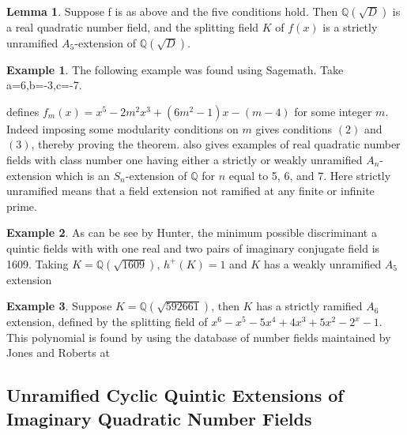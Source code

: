 \documentclass[12pt]{extarticle}
\newcommand{\Q}{\mathbb{Q}}
\newcommand{\<}{\langle}
\renewcommand{\>}{\rangle}
\theoremstyle{definition}
\newtheorem*{example}{Example}
\newtheorem{lemma}{Lemma}
\begin{document}
\begin{lemma}
Suppose f is as above and the five conditions hold. Then $\Q(\sqrt{D})$ is a real quadratic number field, and the splitting field $K$ of $f(x) $ is a strictly unramified $A_5$-extension of $\Q(\sqrt{D})$. 
\end{lemma}
\begin{example}
    The following example was found using Sagemath. Take a=6,b=-3,c=-7. 
\end{example}
\cite{YAMAMURA2} defines $f_m(x)= x^5-2m^2x^3+(6m^2-1)x-(m-4)$ for some integer $m$. Indeed imposing some modularity conditions on $m$ gives conditions $(2)$ and $(3)$, thereby proving the theorem. 
\cite{YAMAMURA2} also gives examples of real quadratic number fields with class number one having either a strictly or weakly unramified $A_n$-extension which is an $S_n$-extension of $\Q$ for $n$ equal to 5, 6, and 7. Here strictly unramified means that a field extension not ramified at any finite or infinite prime.
\begin{example}
As can be see by Hunter, the minimum possible discriminant a quintic fields with with one real and two pairs of imaginary conjugate field is 1609. 
Taking $K=\Q(\sqrt{1609})$, $h^{+}(K)=1$ and $K$ has a weakly unramified $A_5$ extension
\end{example}
\begin{example}
Suppose $K=\Q(\sqrt{592661})$, then $K$ has a strictly ramified $A_6$ extension, defined by the splitting field of  $x^6 - x^5 - 5x^4 + 4x^3 + 5x^2 - 2^x - 1$. This polynomial is found by using the database of number fields maintained by Jones and Roberts at \cite{JONE2}
\end{example}
\subsection{Unramified Cyclic Quintic Extensions of Imaginary Quadratic Number Fields}
\end{document}
